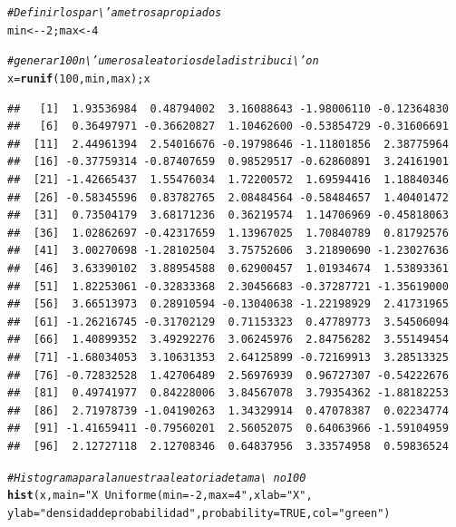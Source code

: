 \documentclass[12pt,letterpaper]{article}\usepackage[]{graphicx}\usepackage[]{color}
\makeatletter
\newcommand{\hlnum}[1]{\textcolor[rgb]{0.686,0.059,0.569}{#1}}%
\newcommand{\hlstr}[1]{\textcolor[rgb]{0.192,0.494,0.8}{#1}}%
\newcommand{\hlcom}[1]{\textcolor[rgb]{0.678,0.584,0.686}{\textit{#1}}}%
\newcommand{\hlopt}[1]{\textcolor[rgb]{0,0,0}{#1}}%
\newcommand{\hlstd}[1]{\textcolor[rgb]{0.345,0.345,0.345}{#1}}%
\newcommand{\hlkwb}[1]{\textcolor[rgb]{0.69,0.353,0.396}{#1}}%
\newcommand{\hlkwc}[1]{\textcolor[rgb]{0.333,0.667,0.333}{#1}}%
\newcommand{\hlkwd}[1]{\textcolor[rgb]{0.737,0.353,0.396}{\textbf{#1}}}%
\newenvironment{kframe}{%
 \def\at@end@of@kframe{}%
 \ifinner\ifhmode%
  \def\at@end@of@kframe{\end{minipage}}%
  \begin{minipage}{\columnwidth}%
 \fi\fi%
 \def\FrameCommand##1{\hskip\@totalleftmargin \hskip-\fboxsep
 \colorbox{shadecolor}{##1}\hskip-\fboxsep
     \hskip-\linewidth \hskip-\@totalleftmargin \hskip\columnwidth}%
 \MakeFramed {\advance\hsize-\width
   \@totalleftmargin\z@ \linewidth\hsize
   \@setminipage}}%
 {\par\unskip\endMakeFramed%
 \at@end@of@kframe}
\newenvironment{knitrout}{}{} %
\makeatother
\begin{document}
\begin{knitrout}
\color{fgcolor}\begin{kframe}
\begin{alltt}
\hlcom{# Definir los par\textbackslash{}'ametros apropiados}
\hlstd{min} \hlkwb{<-} \hlopt{-}\hlnum{2}\hlstd{; max} \hlkwb{<-} \hlnum{4}

\hlcom{# generar 100 n\textbackslash{}'umeros aleatorios de la distribuci\textbackslash{}'on }
\hlstd{x} \hlkwb{=} \hlkwd{runif}\hlstd{(}\hlnum{100}\hlstd{, min, max); x}
\end{alltt}
\begin{verbatim}
##   [1]  1.93536984  0.48794002  3.16088643 -1.98006110 -0.12364830
##   [6]  0.36497971 -0.36620827  1.10462600 -0.53854729 -0.31606691
##  [11]  2.44961394  2.54016676 -0.19798646 -1.11801856  2.38775964
##  [16] -0.37759314 -0.87407659  0.98529517 -0.62860891  3.24161901
##  [21] -1.42665437  1.55476034  1.72200572  1.69594416  1.18840346
##  [26] -0.58345596  0.83782765  2.08484564 -0.58484657  1.40401472
##  [31]  0.73504179  3.68171236  0.36219574  1.14706969 -0.45818063
##  [36]  1.02862697 -0.42317659  1.13967025  1.70840789  0.81792576
##  [41]  3.00270698 -1.28102504  3.75752606  3.21890690 -1.23027636
##  [46]  3.63390102  3.88954588  0.62900457  1.01934674  1.53893361
##  [51]  1.82253061 -0.32833368  2.30456683 -0.37287721 -1.35619000
##  [56]  3.66513973  0.28910594 -0.13040638 -1.22198929  2.41731965
##  [61] -1.26216745 -0.31702129  0.71153323  0.47789773  3.54506094
##  [66]  1.40899352  3.49292276  3.06245976  2.84756282  3.55149454
##  [71] -1.68034053  3.10631353  2.64125899 -0.72169913  3.28513325
##  [76] -0.72832528  1.42706489  2.56976939  0.96727307 -0.54222676
##  [81]  0.49741977  0.84228006  3.84567078  3.79354362 -1.88182253
##  [86]  2.71978739 -1.04190263  1.34329914  0.47078387  0.02234774
##  [91] -1.41659411 -0.79560201  2.56052075  0.64063966 -1.59104959
##  [96]  2.12727118  2.12708346  0.64837956  3.33574958  0.59836524
\end{verbatim}
\begin{alltt}
\hlcom{# Histograma para la nuestra aleatoria de tama\textbackslash{}~no 100 }
\hlkwd{hist}\hlstd{(x,} \hlkwc{main}\hlstd{=}\hlstr{"X ~ Uniforme(min=-2, max=4"}\hlstd{,} \hlkwc{xlab}\hlstd{=}\hlstr{"X"}\hlstd{,}
     \hlkwc{ylab}\hlstd{=}\hlstr{"densidad de probabilidad"}\hlstd{,} \hlkwc{probability}\hlstd{=}\hlnum{TRUE}\hlstd{,} \hlkwc{col}\hlstd{=}\hlstr{"green"}\hlstd{)}


\end{alltt}
\end{kframe}
\end{knitrout}
\end{document}
